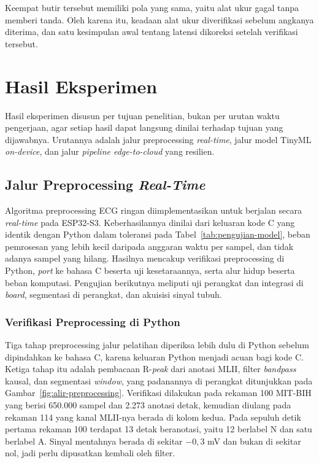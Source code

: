 Keempat butir tersebut memiliki pola yang sama, yaitu alat ukur gagal tanpa memberi tanda. Oleh karena itu, keadaan alat ukur diverifikasi sebelum angkanya diterima, dan satu kesimpulan awal tentang latensi dikoreksi setelah verifikasi tersebut.

\section{Hasil Eksperimen}

Hasil eksperimen disusun per tujuan penelitian, bukan per urutan waktu pengerjaan, agar setiap hasil dapat langsung dinilai terhadap tujuan yang dijawabnya. Urutannya adalah jalur preprocessing \textit{real-time}, jalur model TinyML \textit{on-device}, dan jalur \textit{pipeline edge-to-cloud} yang resilien.

\subsection{Jalur Preprocessing \textit{Real-Time}}

Algoritma preprocessing ECG ringan diimplementasikan untuk berjalan secara \textit{real-time} pada ESP32-S3. Keberhasilannya dinilai dari keluaran kode C yang identik dengan Python dalam toleransi pada Tabel~\ref{tab:pengujian-model}, beban pemrosesan yang lebih kecil daripada anggaran waktu per sampel, dan tidak adanya sampel yang hilang. Hasilnya mencakup verifikasi preprocessing di Python, \textit{port} ke bahasa C beserta uji kesetaraannya, serta alur hidup beserta beban komputasi. Pengujian berikutnya meliputi uji perangkat dan integrasi di \textit{board}, segmentasi di perangkat, dan akuisisi sinyal tubuh.

\subsubsection{Verifikasi Preprocessing di Python}

Tiga tahap preprocessing jalur pelatihan diperiksa lebih dulu di Python sebelum dipindahkan ke bahasa C, karena keluaran Python menjadi acuan bagi kode C. Ketiga tahap itu adalah pembacaan R-\textit{peak} dari anotasi MLII, filter \textit{bandpass} kausal, dan segmentasi \textit{window}, yang padanannya di perangkat ditunjukkan pada Gambar~\ref{fig:alir-preprocessing}. Verifikasi dilakukan pada rekaman 100 MIT-BIH yang berisi 650.000 sampel dan 2.273 anotasi detak, kemudian diulang pada rekaman 114 yang kanal MLII-nya berada di kolom kedua. Pada sepuluh detik pertama rekaman 100 terdapat 13 detak beranotasi, yaitu 12 berlabel N dan satu berlabel A. Sinyal mentahnya berada di sekitar $-0{,}3$ mV dan bukan di sekitar nol, jadi perlu dipusatkan kembali oleh filter.

